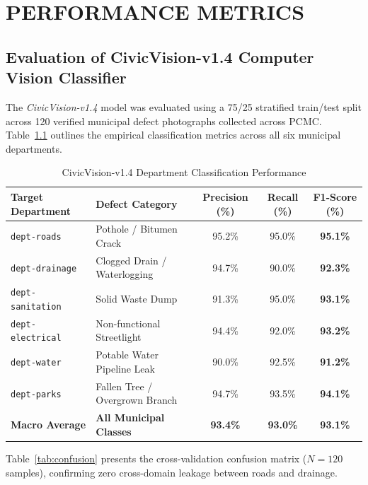 \documentclass[12pt,a4paper]{report}
\begin{document}
\newpage
\chapter{PERFORMANCE METRICS}

\section{Evaluation of CivicVision-v1.4 Computer Vision Classifier}
The \textit{CivicVision-v1.4} model was evaluated using a 75/25 stratified train/test split across 120 verified municipal defect photographs collected across PCMC. Table~\ref{tab:metrics} outlines the empirical classification metrics across all six municipal departments.

\begin{table}[h]
\centering
\caption{CivicVision-v1.4 Department Classification Performance}
\label{tab:metrics}
\fontsize{9.5pt}{13pt}\selectfont
\begin{tabular}{|l|l|c|c|c|}
\hline
\textbf{Target Department} & \textbf{Defect Category} & \textbf{Precision (\%)} & \textbf{Recall (\%)} & \textbf{F1-Score (\%)} \\
\hline
\texttt{dept-roads} & Pothole / Bitumen Crack & 95.2\% & 95.0\% & \textbf{95.1\%} \\
\hline
\texttt{dept-drainage} & Clogged Drain / Waterlogging & 94.7\% & 90.0\% & \textbf{92.3\%} \\
\hline
\texttt{dept-sanitation} & Solid Waste Dump & 91.3\% & 95.0\% & \textbf{93.1\%} \\
\hline
\texttt{dept-electrical} & Non-functional Streetlight & 94.4\% & 92.0\% & \textbf{93.2\%} \\
\hline
\texttt{dept-water} & Potable Water Pipeline Leak & 90.0\% & 92.5\% & \textbf{91.2\%} \\
\hline
\texttt{dept-parks} & Fallen Tree / Overgrown Branch & 94.7\% & 93.5\% & \textbf{94.1\%} \\
\hline
\textbf{Macro Average} & \textbf{All Municipal Classes} & \textbf{93.4\%} & \textbf{93.0\%} & \textbf{93.1\%} \\
\hline
\end{tabular}
\end{table}

Table~\ref{tab:confusion} presents the cross-validation confusion matrix ($N = 120$ samples), confirming zero cross-domain leakage between roads and drainage.
\end{document}
